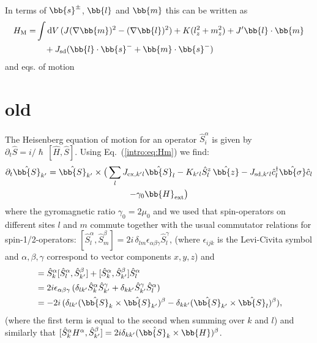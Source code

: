 In terms of $\bb{s}^\pm$, $\bb{l}$ and $\bb{m}$ this can be written as
\begin{align}
    H_\text{M} =& \int \mathrm{d}V \,(J(\nabla\bb{m})^2-(\nabla\bb{l})^2)+K(l_z^2+m_z^2)+J'\bb{l}\cdot\bb{m}\nonumber\\
    & \quad + J_\text{sd} (\bb{l}\cdot\bb{s}^-+\bb{m}\cdot\bb{s}^-)
\end{align}
and eqs. of motion
\section{old}

The Heisenberg equation of motion for an operator $\hat{S}_i^\alpha$ is given by $\partial_t \hat{S}=i/\hslash\,[\hat{H},\hat{S}]$. Using Eq.~(\ref{intro:eq:Hm}) we find:
\begin{multline}
    \partial_t \hat{\bb{S}}_{k'} =
        \hat{\bb{S}}_{k'}\times 
            \big (
                \sum_{l} J_{\text{ex},k'l} \hat{\bb{S}}_l - K_{k'l} \hat{S}^z_l\,\hat{\bb{z}}-J_{\text{sd},k'l} \hat{c}^\dagger_l\hat{\bb{\sigma}}\hat{c}_l\\
                -\gamma_0 \bb{H}_\text{ext}
            \big )
\end{multline}
where the gyromagnetic ratio $\gamma_0=2\mu_0$ and we used that spin-operators on different sites $l$ and $m$ commute together with the usual commutator relations for spin-1/2-operators: $[\hat{S}_l^\alpha,\hat{S}_m^\beta] = 2 i \,\delta_{lm} \epsilon_{\alpha\beta\gamma}\hat{S}_l^\gamma$, (where $\epsilon_{ijk}$ is the Levi-Civita symbol and $\alpha,\beta,\gamma$ correspond to vector components $x,y,z$) and  
\begin{align}
    [\hat{S}_k^\alpha\hat{S}_l^\alpha,\hat{S}_{k'}^\beta] &= \hat{S}_k^\alpha[\hat{S}_l^\alpha,\hat{S}_{k'}^\beta]+[\hat{S}_k^\alpha,\hat{S}_{k'}^\beta]\hat{S}^\alpha_l\nonumber\\
    & = 2i\epsilon_{\alpha\beta\gamma}\, (\delta_{lk'}\hat{S}_{k}^\alpha\hat{S}_{k'}^\gamma +\delta_{kk'}\hat{S}_{k'}^\gamma\hat{S}_{l}^\alpha)\nonumber\\
    &=-2 i \,(\delta_{lk'}(\hat{\bb{S}}_k \times\hat{\bb{S}}_{k'})^\beta -\delta_{kk'}(\hat{\bb{S}}_{k'}\times\hat{\bb{S}}_l)^\beta),
\end{align}
(where the first term is equal to the second when summing over $k$ and ${l}$)
and similarly that $[\hat{S}_k^\alpha H^\alpha,\hat{S}^\beta_{k'}] = 2i \delta_{kk'}(\hat{\bb{S}_k}\times\bb{H})^\beta$. 

